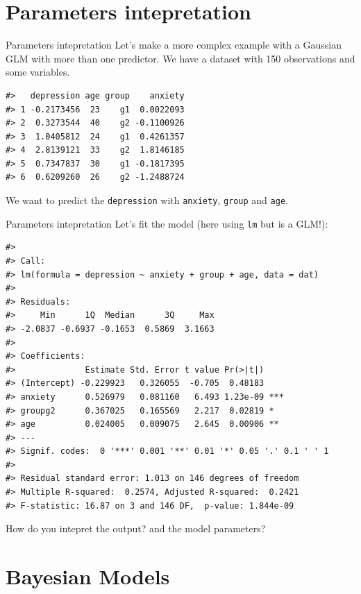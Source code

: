\documentclass[
  ignorenonframetext,
]{beamer}
\begin{document}
\section{Parameters intepretation}\label{parameters-intepretation}

\begin{frame}[fragile]{Parameters intepretation}
\label{parameters-intepretation-1}
Let's make a more complex example with a Gaussian GLM with more than one
predictor. We have a dataset with 150 observations and some variables.

\begin{verbatim}
#>   depression age group    anxiety
#> 1 -0.2173456  23    g1  0.0022093
#> 2  0.3273544  40    g2 -0.1100926
#> 3  1.0405812  24    g1  0.4261357
#> 4  2.8139121  33    g2  1.8146185
#> 5  0.7347837  30    g1 -0.1817395
#> 6  0.6209260  26    g2 -1.2488724
\end{verbatim}

We want to predict the \texttt{depression} with \texttt{anxiety},
\texttt{group} and \texttt{age}.
\end{frame}

\begin{frame}[fragile]{Parameters intepretation}
\label{parameters-intepretation-2}
Let's fit the model (here using \texttt{lm} but is a GLM!):

\begin{verbatim}
#> 
#> Call:
#> lm(formula = depression ~ anxiety + group + age, data = dat)
#> 
#> Residuals:
#>     Min      1Q  Median      3Q     Max 
#> -2.0837 -0.6937 -0.1653  0.5869  3.1663 
#> 
#> Coefficients:
#>              Estimate Std. Error t value Pr(>|t|)    
#> (Intercept) -0.229923   0.326055  -0.705  0.48183    
#> anxiety      0.526979   0.081160   6.493 1.23e-09 ***
#> groupg2      0.367025   0.165569   2.217  0.02819 *  
#> age          0.024005   0.009075   2.645  0.00906 ** 
#> ---
#> Signif. codes:  0 '***' 0.001 '**' 0.01 '*' 0.05 '.' 0.1 ' ' 1
#> 
#> Residual standard error: 1.013 on 146 degrees of freedom
#> Multiple R-squared:  0.2574, Adjusted R-squared:  0.2421 
#> F-statistic: 16.87 on 3 and 146 DF,  p-value: 1.844e-09
\end{verbatim}

How do you intepret the output? and the model parameters?
\end{frame}

\section{Bayesian Models}\label{bayesian-models}
\end{document}
